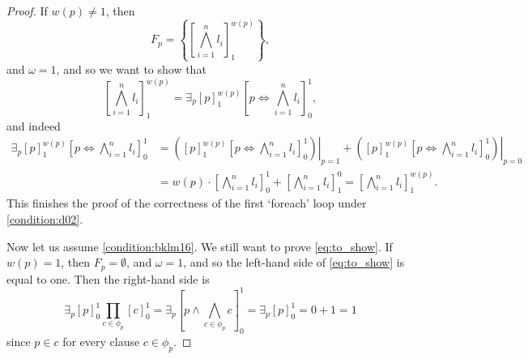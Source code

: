 \documentclass[runningheads]{llncs}
\begin{document}
\begin{proof}
  If $w(p) \ne 1$, then
  \[
    F_p = \left\{ \left[ \bigwedge_{i = 1}^n l_i \right]_1^{w(p)} \right\},
  \]
  and $\omega = 1$, and so we want to show that
  \[
    \left[ \bigwedge_{i = 1}^n l_i \right]_1^{w(p)} = \exists_p [p]_1^{w(p)}
    \left[ p \Leftrightarrow \bigwedge_{i=1}^n l_i \right]_0^1,
  \]
  and indeed
  \begin{align*}
    \exists_p [p]_1^{w(p)} \left[ p \Leftrightarrow \bigwedge_{i=1}^n l_i \right]_0^1 &= \left.\left( [p]_1^{w(p)} \left[ p \Leftrightarrow \bigwedge_{i=1}^n l_i \right]_0^1 \right)\right|_{p=1} + \left.\left([p]_1^{w(p)} \left[ p \Leftrightarrow \bigwedge_{i=1}^n l_i \right]_0^1 \right)\right|_{p=0} \\
                                                                                      &= w(p) \cdot \left[ \bigwedge_{i=1}^n l_i \right]_0^1 + \left[ \bigwedge_{i=1}^n l_i \right]_1^0 = \left[ \bigwedge_{i=1}^n l_i \right]_1^{w(p)}.
  \end{align*}
  This finishes the proof of the correctness of the first `foreach' loop under
  \cref{condition:d02}.

  Now let us assume \cref{condition:bklm16}. We still want to prove
  \cref{eq:to_show}. If $w(p) = 1$, then $F_p = \emptyset$, and $\omega = 1$,
  and so the left-hand side of \cref{eq:to_show} is equal to one. Then the
  right-hand side is
  \[
    \exists_p [p]_0^1 \prod_{c \in \phi_p} [c]_0^1 = \exists_p \left[ p \land
      \bigwedge_{c \in \phi_p} c \right]_0^1 = \exists_p [p]_0^1 = 0 + 1 = 1
  \]
  since $p \in c$ for every clause $c \in \phi_p$.


\end{proof}
\end{document}

